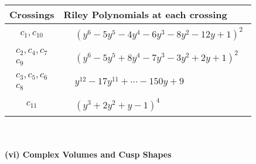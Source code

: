 \documentclass[1p]{elsarticle_modified}
\theoremstyle{definition}
\begin{document}
\begin{tabular}{m{50pt}|m{274pt}}
Crossings & \hspace{64pt}Riley Polynomials at each crossing \\
\hline $$\begin{aligned}c_{1},c_{10}\end{aligned}$$&$\begin{aligned}
&(y^6-5 y^5-4 y^4-6 y^3-8 y^2-12 y+1)^2
\end{aligned}$\\
\hline $$\begin{aligned}c_{2},c_{4},c_{7}\\c_{9}\end{aligned}$$&$\begin{aligned}
&(y^6-5 y^5+8 y^4-7 y^3-3 y^2+2 y+1)^2
\end{aligned}$\\
\hline $$\begin{aligned}c_{3},c_{5},c_{6}\\c_{8}\end{aligned}$$&$\begin{aligned}
&y^{12}-17 y^{11}+\cdots-150 y+9
\end{aligned}$\\
\hline $$\begin{aligned}c_{11}\end{aligned}$$&$\begin{aligned}
&(y^3+2 y^2+y-1)^4
\end{aligned}$\\
\hline
\end{tabular}\\~\\
\newpage\flushleft \textbf{(vi) Complex Volumes and Cusp Shapes}
\end{document}
